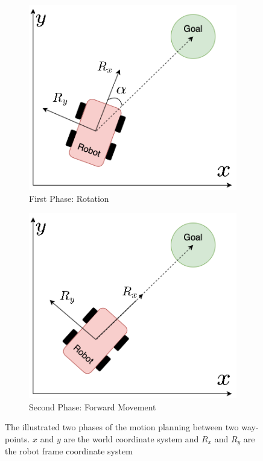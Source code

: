 \begin{figure}[h!]
  \centering
  \begin{subfigure}[b]{0.4\linewidth}
    \includegraphics[width=\linewidth]{images/robot.png}
     \caption{First Phase: Rotation}
  \end{subfigure}
  \hfill
  \begin{subfigure}[b]{0.4\linewidth}
    \includegraphics[width=\linewidth]{images/robot_2.png}
     \caption{Second Phase: Forward Movement}
  \end{subfigure}
  \caption{The illustrated two phases of the motion planning between two way-points. $x$ and $y$ are the world coordinate system and $R_x$ and $R_y$ are the robot frame coordinate system}
  \label{fig: robot_motion}
\end{figure}

